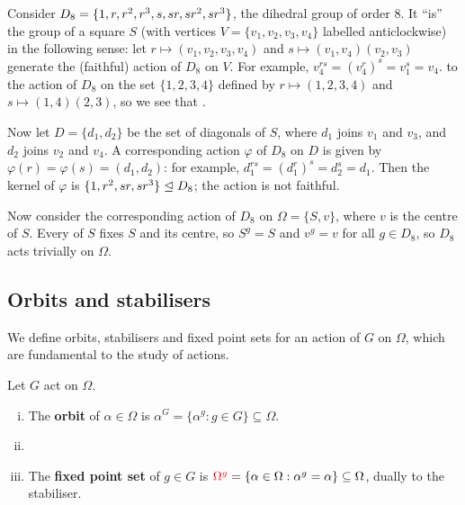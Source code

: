 \begin{example}\label{eg:action_D8_on_square}
    Consider $D_8 = \{1,r,r^2,r^3,s,\added{2}{sr,sr^2,sr^3}\}$, the dihedral group of order 8. It ``is'' the  group of a square $S$ (with vertices $V = \{v_1,v_2,v_3,v_4\}$ labelled anticlockwise) in the following sense: let $r \mapsto (v_1,v_2,v_3,v_4)$ and $s \mapsto (v_1,v_4)(v_2,v_3)$ generate the (faithful) action of $D_8$ on $V$. For example, $v_4^{rs} = (v_4^r)^s = v_1^s = v_4$.  to the action of $D_8$ on the set $\{1,2,3,4\}$ defined by $r \mapsto (1,2,3,4)$ and $s \mapsto (1,4)(2,3)$, so we see that .

    Now let $D = \{d_1,d_2\}$ be the set of diagonals of $S$, where $d_1$ joins $v_1$ and $v_3$, and $d_2$ joins $v_2$ and $v_4$. A corresponding action $\varphi$ of $D_8$ on $D$ is given by $\varphi(r) = \varphi(s) = (d_1,d_2)$: for example, $d_1^{rs} = (d_1^r)^s = d_2^s = d_1$. Then the kernel of $\varphi$ is $\{1,r^2,\added{2}{sr,sr^3}\} \trianglelefteq D_8$; the action is not faithful.

    Now consider the corresponding action of $D_8$ on $\Omega = \{S,v\}$, where $v$ is the centre of $S$. Every  of $S$ fixes $S$ and its centre, so $S^g = S$ and $v^g = v$ for all $g \in D_8$, so $D_8$ acts trivially on $\Omega$.
\end{example}

\subsection{Orbits and stabilisers}

We define orbits, stabilisers and fixed point sets for an action of $G$ on $\Omega$, which are fundamental to the study of actions.

\begin{definition}\label{def:orbit_stabiliser}
    Let $G$ act on $\Omega$.
    \begin{enumerate}[(i)]
        \item The \textbf{orbit} of $\alpha \in \Omega$ is $\alpha^G = \{\alpha^g : g \in G\} \subseteq \Omega$.
        \item {}
        \item The \textbf{fixed point set} of $g \in G$ is $\added{3}{\Omega^g} = \{\alpha \in \Omega : \alpha^g = \alpha\} \subseteq \Omega$, dually to the stabiliser.
    \end{enumerate}
\end{definition}

